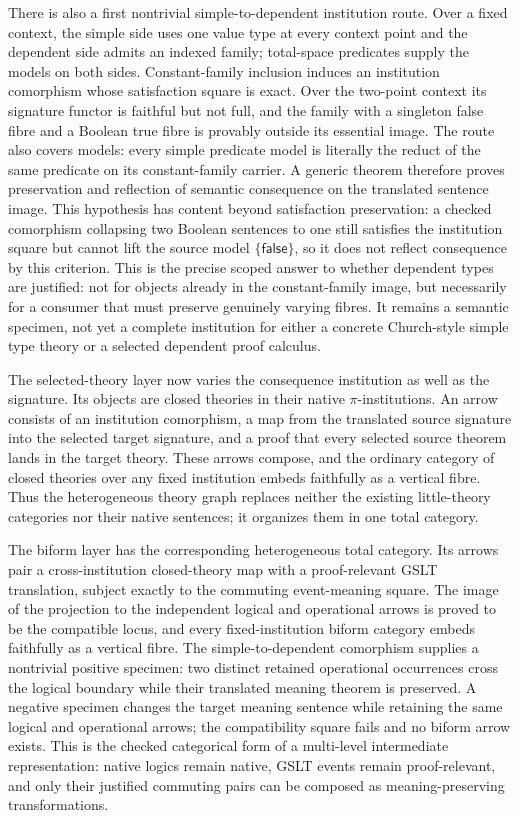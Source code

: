 \documentclass[11pt]{article}
\theoremstyle{definition}
\theoremstyle{remark}
\begin{document}
There is also a first nontrivial simple-to-dependent institution route.  Over a
fixed context, the simple side uses one value type at every context point and
the dependent side admits an indexed family; total-space predicates supply the
models on both sides.  Constant-family inclusion induces an institution
comorphism whose satisfaction square is exact.  Over the two-point context its
signature functor is faithful but not full, and the family with a singleton
false fibre and a Boolean true fibre is provably outside its essential image.
The route also covers models: every simple predicate model is literally the
reduct of the same predicate on its constant-family carrier.  A generic theorem
therefore proves preservation and reflection of semantic consequence on the
translated sentence image.  This hypothesis has content beyond satisfaction
preservation: a checked comorphism collapsing two Boolean sentences to one
still satisfies the institution square but cannot lift the source model
$\{\mathsf{false}\}$, so it does not reflect consequence by this criterion.
This is the precise scoped answer to whether dependent types are justified:
not for objects already in the constant-family image, but necessarily for a
consumer that must preserve genuinely varying fibres.  It remains a semantic
specimen, not yet a complete institution for either a concrete Church-style
simple type theory or a selected dependent proof calculus.

The selected-theory layer now varies the consequence institution as well as
the signature.  Its objects are closed theories in their native
$\pi$-institutions.  An arrow consists of an institution comorphism, a map from
the translated source signature into the selected target signature, and a
proof that every selected source theorem lands in the target theory.  These
arrows compose, and the ordinary category of closed theories over any fixed
institution embeds faithfully as a vertical fibre.  Thus the heterogeneous
theory graph replaces neither the existing little-theory categories nor their native
sentences; it organizes them in one total category.

The biform layer has the corresponding heterogeneous total category.  Its
arrows pair a cross-institution closed-theory map with a proof-relevant GSLT
translation, subject exactly to the commuting event-meaning square.  The image
of the projection to the independent logical and operational arrows is proved
to be the compatible locus, and every fixed-institution biform category embeds
faithfully as a vertical fibre.  The simple-to-dependent comorphism supplies a
nontrivial positive specimen: two distinct retained operational occurrences
cross the logical boundary while their translated meaning theorem is
preserved.  A negative specimen changes the target meaning sentence while
retaining the same logical and operational arrows; the compatibility square
fails and no biform arrow exists.  This is the checked categorical form of a
multi-level intermediate representation: native logics remain native, GSLT
events remain proof-relevant, and only their justified commuting pairs can be
composed as meaning-preserving transformations.
\end{document}
